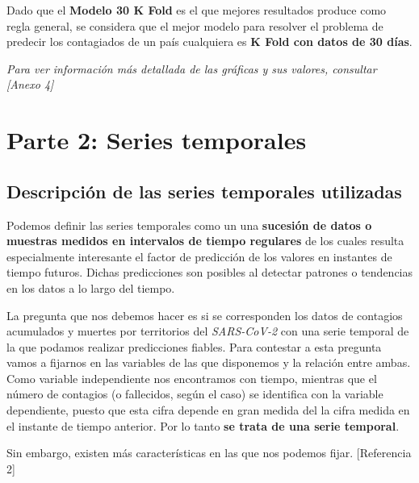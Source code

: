 \documentclass[12pt,a4paper, xcolor=table]{article}
\begin{document}
    \vspace{2mm}

    Dado que el \textbf{Modelo 30 K Fold} es el que mejores resultados produce como regla general, se considera que el mejor modelo para resolver el problema de predecir los contagiados de un país cualquiera es \textbf{K Fold con datos de 30 días}.

    \vspace{6mm}

    \textit{Para ver información más detallada de las gráficas y sus valores, consultar [Anexo 4]}



    \newpage
    \section{Parte 2: Series temporales}

    \subsection{Descripción de las series temporales utilizadas}

        Podemos definir las series temporales como un una \textbf{sucesión de datos o muestras medidos en intervalos de tiempo regulares} de los cuales resulta especialmente interesante el factor de predicción de los valores en instantes de tiempo futuros. Dichas predicciones son posibles al detectar patrones o tendencias en los datos a lo largo del tiempo.

        \vspace{2mm}

        La pregunta que nos debemos hacer es si se corresponden los datos de contagios acumulados y muertes por territorios del  \textit{SARS-CoV-2} con una serie temporal de la que podamos realizar predicciones fiables. Para contestar a esta pregunta vamos a fijarnos en las variables de las que disponemos y la relación entre ambas. Como variable independiente nos encontramos con tiempo, mientras que el número de contagios (o fallecidos, según el caso) se identifica con la variable dependiente, puesto que esta cifra depende en gran medida del la cifra medida en el instante de tiempo anterior. Por lo tanto \textbf{se trata de una serie temporal}.

        \vspace{2mm}

        Sin embargo, existen más características en las que nos podemos fijar. [Referencia 2]
        
\end{document}
